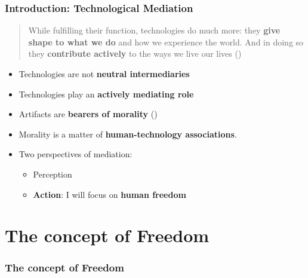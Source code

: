 \documentclass{beamer}
\begin{document}
\begin{frame}
\frametitle{Introduction: Technological Mediation}
\begin{quote}While fulfilling their function, technologies do much more: they \textbf{give shape to what we do} and how we experience the world. 
	And in doing so they \textbf{contribute actively} to the ways we live our lives (\cite{verbeek2011moralizing})
\end{quote}

\begin{itemize}
	\item Technologies are not \textbf{neutral intermediaries}
	\item Technologies play an \textbf{actively mediating role} 
	\item Artifacts are \textbf{bearers of morality} (\cite{latour1992})
	\item Morality is a matter
of \textbf{human-technology associations}.
	 
\end{itemize}

\begin{itemize}
	\item Two perspectives of mediation:
	\begin{itemize}
		\item Perception
		\item \textbf{Action}: %
		I will focus on \textbf{human freedom}
	\end{itemize}
\end{itemize}
\end{frame}

\section{The concept of Freedom}

\begin{frame}
\frametitle{The concept of Freedom}

\end{frame}
\end{document}
